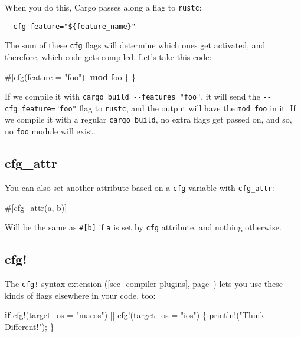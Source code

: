\documentclass[a4paper,]{book}
\renewcommand*{\hyperref}[2][\ar]{%
  \def\ar{#2}%
  #2 (\autoref{#1}, page~\pageref{#1})}
\newenvironment{Shaded}{\begin{snugshade}}{\end{snugshade}}
\newcommand{\KeywordTok}[1]{\textcolor[rgb]{0.13,0.29,0.53}{\textbf{{#1}}}}
\newcommand{\StringTok}[1]{\textcolor[rgb]{0.31,0.60,0.02}{{#1}}}
\newcommand{\OtherTok}[1]{\textcolor[rgb]{0.56,0.35,0.01}{{#1}}}
\newcommand{\NormalTok}[1]{{#1}}
\begin{document}
When you do this, Cargo passes along a flag to \texttt{rustc}:

\begin{verbatim}
--cfg feature="${feature_name}"
\end{verbatim}

The sum of these \texttt{cfg} flags will determine which ones get
activated, and therefore, which code gets compiled. Let's take this
code:

\begin{Shaded}
\begin{Highlighting}[]
\OtherTok{#[}\NormalTok{cfg}\OtherTok{(}\NormalTok{feature }\OtherTok{=} \StringTok{"foo"}\OtherTok{)]}
\KeywordTok{mod} \NormalTok{foo \{}
\NormalTok{\}}
\end{Highlighting}
\end{Shaded}

If we compile it with \texttt{cargo\ build\ -\/-features\ "foo"}, it
will send the \texttt{-\/-cfg\ feature="foo"} flag to \texttt{rustc},
and the output will have the \texttt{mod\ foo} in it. If we compile it
with a regular \texttt{cargo\ build}, no extra flags get passed on, and
so, no \texttt{foo} module will exist.

\subsection{cfg\_attr}\label{cfgux5fattr}

You can also set another attribute based on a \texttt{cfg} variable with
\texttt{cfg\_attr}:

\begin{Shaded}
\begin{Highlighting}[]
\OtherTok{#[}\NormalTok{cfg_attr}\OtherTok{(}\NormalTok{a}\OtherTok{,} \NormalTok{b}\OtherTok{)]}
\end{Highlighting}
\end{Shaded}

Will be the same as \texttt{\#{[}b{]}} if \texttt{a} is set by
\texttt{cfg} attribute, and nothing otherwise.

\subsection{cfg!}\label{cfg}

The \texttt{cfg!} \hyperref[sec--compiler-plugins]{syntax extension}
lets you use these kinds of flags elsewhere in your code, too:

\begin{Shaded}
\begin{Highlighting}[]
\KeywordTok{if} \OtherTok{cfg!}\NormalTok{(target_os = }\StringTok{"macos"}\NormalTok{) || }\OtherTok{cfg!}\NormalTok{(target_os = }\StringTok{"ios"}\NormalTok{) \{}
    \OtherTok{println!}\NormalTok{(}\StringTok{"Think Different!"}\NormalTok{);}
\NormalTok{\}}
\end{Highlighting}
\end{Shaded}
\end{document}
